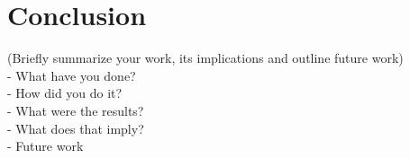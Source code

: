 %
%
\chapter{Conclusion}\label{sec:Conclusion}
(Briefly summarize your work, its implications and outline future work) \\
- What have you done? \\
- How did you do it? \\
- What were the results? \\
- What does that imply? \\
- Future work